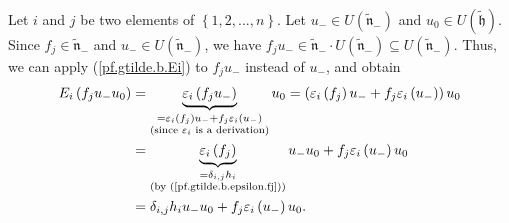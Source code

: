\documentclass[etingof-lie.tex]{subfiles}
\begin{document}
\begin{verlong}
Let $i$ and $j$ be two elements of $\left\{  1,2,...,n\right\}  $. Let
$u_{-}\in U\left(  \widetilde{\mathfrak{n}}_{-}\right)  $ and $u_{0}\in
U\left(  \widetilde{\mathfrak{h}}\right)  $. Since $f_{j}\in
\widetilde{\mathfrak{n}}_{-}$ and $u_{-}\in U\left(  \widetilde{\mathfrak{n}%
}_{-}\right)  $, we have $f_{j}u_{-}\in\widetilde{\mathfrak{n}}_{-}\cdot
U\left(  \widetilde{\mathfrak{n}}_{-}\right)  \subseteq U\left(
\widetilde{\mathfrak{n}}_{-}\right)  $. Thus, we can apply
(\ref{pf.gtilde.b.Ei}) to $f_{j}u_{-}$ instead of $u_{-}$, and obtain%
\begin{align}
E_{i}\left(  f_{j}u_{-}u_{0}\right)   &  =\underbrace{\varepsilon_{i}\left(
f_{j}u_{-}\right)  }_{\substack{=\varepsilon_{i}\left(  f_{j}\right)
u_{-}+f_{j}\varepsilon_{i}\left(  u_{-}\right)  \\\text{(since }%
\varepsilon_{i}\text{ is a derivation)}}}u_{0}=\left(  \varepsilon_{i}\left(
f_{j}\right)  u_{-}+f_{j}\varepsilon_{i}\left(  u_{-}\right)  \right)
u_{0}\nonumber\\
&  =\underbrace{\varepsilon_{i}\left(  f_{j}\right)  }_{\substack{=\delta
_{i,j}h_{i}\\\text{(by (\ref{pf.gtilde.b.epsilon.fj}))}}}u_{-}u_{0}%
+f_{j}\varepsilon_{i}\left(  u_{-}\right)  u_{0}\nonumber\\
&  =\delta_{i,j}h_{i}u_{-}u_{0}+f_{j}\varepsilon_{i}\left(  u_{-}\right)
u_{0}. \label{pf.gtilde.dercomm7}%
\end{align}

\end{verlong}
\end{document}
